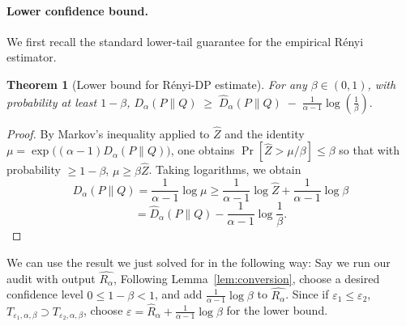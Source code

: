 \documentclass{article}
\theoremstyle{plain}
\newtheorem{theorem}{Theorem}[section]
\theoremstyle{definition}
\theoremstyle{remark}
\begin{document}
\paragraph{Lower confidence bound.}
We first recall the standard lower-tail guarantee for the empirical
R\'enyi estimator.

\begin{theorem}[Lower bound for R\'enyi-DP estimate]
\label{thm:lower}
For any $\beta \in (0,1)$, with probability at least $1-\beta$,
\(
D_\alpha(P\|Q)
\;\ge\;
\widehat{D}_\alpha(P\|Q)
\;-\;
\frac{1}{\alpha - 1}\log\left(\frac{1}{\beta}\right).
\)
\end{theorem}

\begin{proof}
By Markov's inequality applied to $\widehat{Z}$ and the identity
$\mu = \exp\!\big((\alpha-1)D_\alpha(P\|Q)\big)$, one obtains
$\Pr[\widehat{Z} > \mu/\beta] \leq \beta$ so that with probability $\geq 1-\beta$,
$\mu\geq \beta\widehat{Z}$. Taking logarithms, we obtain
\[
D_\alpha(P\|Q) = \frac{1}{\alpha-1}\log \mu \geq \frac{1}{\alpha-1}\log\widehat{Z} + \frac{1}{\alpha-1}\log\beta 
\]
\[
=\widehat{D}_\alpha(P\|Q) - \frac{1}{\alpha-1} \log\frac{1}{\beta}.
\]
\end{proof}

We can use the result we just solved for in the following way: Say we run our audit with output $\widehat{R_\alpha}$, Following Lemma~\ref{lem:conversion}, choose a desired confidence level $0 \leq 1-\beta < 1$, and add $\frac{1}{\alpha-1}\log{\beta}$ to $\widehat{R_\alpha}$. Since if $\varepsilon_1\le \varepsilon_2$, $T_{\varepsilon_1,\alpha, \beta}\supset T_{\varepsilon_2,\alpha,\beta}$, choose $\varepsilon = \widehat R_\alpha + \frac{1}{\alpha-1}\log{\beta}$ for the lower bound. 



    
\end{document}
